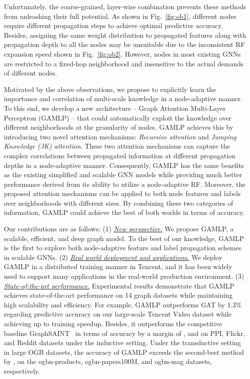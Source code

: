 \documentclass[sigconf]{acmart}
\newcommand{\sys}{\textsc{GAMLP}\xspace}
\begin{document}
Unfortunately, the coarse-grained, layer-wise combination prevents these methods from unleashing their full potential.
As shown in Fig.~\ref{fig:ob1}, different nodes require different propagation steps to achieve optimal predictive accuracy. 
Besides, assigning the same weight distribution to propagated features along with propagation depth to all the nodes may be unsuitable due to the inconsistent RF expansion speed shown in Fig.~\ref{fig:ob2}.
However, nodes in most existing GNNs are restricted to a fixed-hop neighborhood and insensitive to the actual demands of different nodes. 

Motivated by the above observations, we propose to explicitly learn the importance and correlation of multi-scale knowledge in a node-adaptive manner. 
To this end, we develop a new architecture -- Graph Attention Multi-Layer Perceptron (GAMLP) -- that could automatically exploit the knowledge over different neighborhoods at the granularity of nodes.
GAMLP achieves this by introducing two novel attention mechanisms: \emph{Recursive attention} and \emph{Jumping Knowledge (JK) attention}. 
These two attention mechanisms can capture the complex correlations between propagated information at different propagation depths in a node-adaptive manner.
Consequently, \sys has the same benefits as the existing simplified and scalable GNN models while providing much better performance derived from its ability to utilize a node-adaptive RF.
Moreover, the proposed attention mechanisms can be applied to both node features and labels over neighborhoods with different sizes. 
By combining these two categories of information, GAMLP could achieve the best of both worlds in terms of accuracy.




Our contributions are as follows: 
(1) \textit{\underline{New perspective.}} We propose GAMLP, a scalable, efficient, and deep graph model. To the best of our knowledge, GAMLP is the first to explore both node-adaptive feature and label propagation schemes in scalable GNNs.
(2) \textit{\underline{Real world deployment and applications.}} We deploy GAMLP in a distributed training manner in Tencent, and it has been widely used to support many applications in the real-world production environment.
(3) \textit{\underline{State-of-the-art performance.}} Experimental results demonstrate that GAMLP achieves state-of-the-art performance on 14 graph datasets while maintaining high scalability and efficiency.
For example, \sys outperforms GAT by 1.3\% regarding predictive accuracy on our large-scale Tencent Video dataset while achieving up to  training speedup.
Besides, it outperforms the competitive baseline GraphSAINT~\citep{DBLP:conf/iclr/ZengZSKP20} in terms of accuracy by a margin of ,  and  on PPI, Flickr, and Reddit datasets under the inductive setting.
Under the transductive setting in large OGB datasets, the accuracy of \sys exceeds the second-best method by ,   on the ogbn-products, ogbn-papers100M, and ogbn-mag datasets, respectively. 
\end{document}
